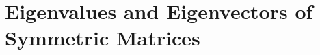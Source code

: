 \section{Eigenvalues and Eigenvectors of Symmetric Matrices} 
\bx{
\en{
    \item 
    \item 
    \item 
}
}